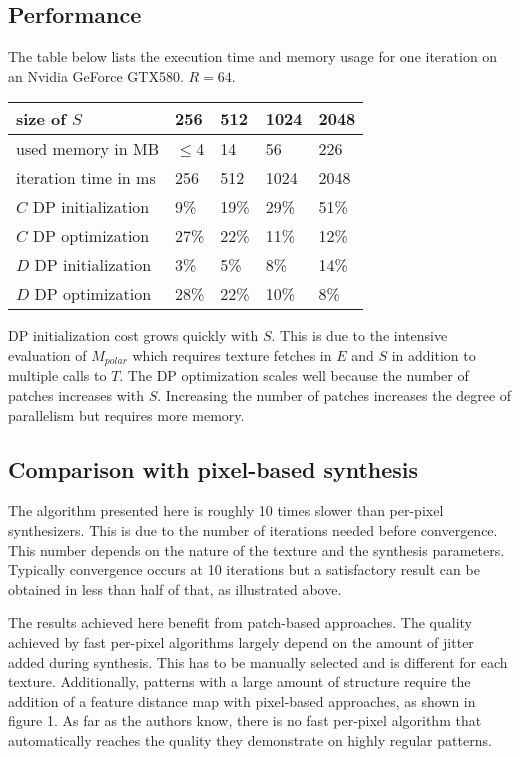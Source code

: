\documentclass{acmsmall}
\begin{document}
\subsection{Performance}
The table below lists the execution time and memory usage for one iteration on an Nvidia GeForce GTX580. $R = 64$.
\begin{center}
    \begin{tabular}{ | l | l | l | l | l |}
    \hline
    size of $S$ & 256 & 512 & 1024 & 2048 \\ \hline
    used memory in MB & $\leq$4 & 14 & 56 & 226 \\ \hline
    iteration time in ms & 256 & 512 & 1024 & 2048 \\ \hline
    $C$ DP initialization & 9\% & 19\% & 29\% & 51\% \\ \hline 
    $C$ DP optimization & 27\% & 22\% & 11\% & 12\% \\ \hline 
    $D$ DP initialization & 3\% & 5\% & 8\% & 14\% \\ \hline 
    $D$ DP optimization & 28\% & 22\% & 10\% & 8\% \\ 
    
    \hline
    \end{tabular}
\end{center}

DP initialization cost grows quickly with $S$. This is due to the intensive evaluation of $M_{polar}$ which requires texture fetches in $E$ and $S$ in addition to multiple calls to $T$. The DP optimization scales well because the number of patches increases with $S$. Increasing the number of patches increases the degree of parallelism but requires more memory.


\subsection{Comparison with pixel-based synthesis}
The algorithm presented here is roughly 10 times slower than per-pixel synthesizers. This is due to the number of iterations needed before convergence. This number depends on the nature of the texture and the synthesis parameters. Typically convergence occurs at 10 iterations but a satisfactory result can be obtained in less than half of that, as illustrated above.

The results achieved here benefit from patch-based approaches. The quality achieved by fast per-pixel algorithms largely depend on the amount of jitter added during synthesis. This has to be manually selected and is different for each texture. Additionally, patterns with a large amount of structure require the addition of a feature distance map with pixel-based approaches, as shown in figure 1. As far as the authors know, there is no fast per-pixel algorithm that automatically reaches the quality they demonstrate on highly regular patterns.
\end{document}
